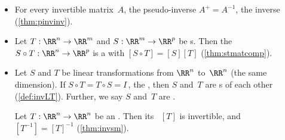 \begin{itemize}
\item For every invertible matrix~\(A\), the pseudo-inverse \(A^+=A^{-1}\), the inverse (\autoref{thm:pinvinv}).

\item Let \(T:\RR^n\to\RR^m\) and \(S:\RR^m\to\RR^p\) be s.  
Then the  \(S\circ T:\RR^n\to\RR^p\) is a  with  \([S\circ T]=[S][T]\) (\autoref{thm:stmatcomp}).

\item Let \(S\) and \(T\) be linear transformations from \(\RR^n\) to~\(\RR^n\) (the same dimension).
If \(S\circ T=T\circ S=I\)\,, the , then \(S\) and~\(T\) are s of each other (\autoref{def:invLT}).  
Further, we say \(S\) and~\(T\) are .

\itemme Let \(T:\RR^n\to\RR^n\) be an  . 
Then its ~\([T]\) is invertible, and \([T^{-1}]=[T]^{-1}\) (\autoref{thm:invsm}). 

\end{itemize}





\makeanswers
